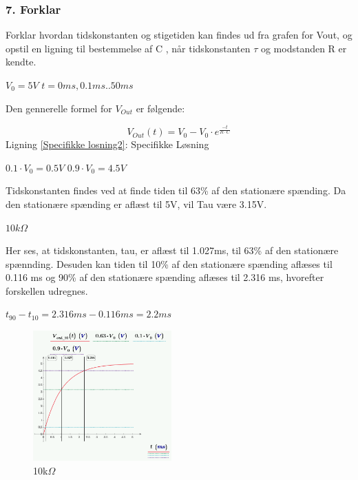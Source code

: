 \subsubsection*{7. Forklar}
Forklar hvordan tidskonstanten og stigetiden kan findes ud fra grafen for 	Vout, og opstil en ligning til bestemmelse af C , når tidskonstanten  $\tau$ og modstanden R er kendte.

$V_{0}=5V$
$t=0ms,0.1ms..50ms$

Den gennerelle formel for $V_{Out}$ er følgende:

\begin{center}
\begin{equation}
V_{Out}(t)=V_{0}-V_{0} \cdot e^{\frac{-t}{R \cdot C}}
\label{Specifikke losning2}
\end{equation}
Ligning \ref{Specifikke losning2}: Specifikke Løsning
\end{center}

\begin{center}
$0.1\cdot V_{0} = 0.5V$
$0.9 \cdot V_{0} = 4.5V$
\end{center}


Tidskonstanten findes ved at finde tiden til 63\% af den stationære spænding.
Da den stationære spænding er aflæst til 5V, vil Tau være 3.15V.

\textbf{$10k\Omega$}

Her ses, at tidskonstanten, tau, er aflæst til 1.027ms, til 63\% af den stationære spænnding.
Desuden kan tiden til 10\% af den stationære spænding aflæses til 0.116 ms og 90\% af den stationære spænding aflæses til 2.316 ms, hvorefter forskellen udregnes.
\begin{center}

$t_{90}-t_{10}=2.316ms-0.116ms=2.2ms$

\end{center}


\begin{figure}[h]
\begin{center}
\includegraphics[height=5cm]{M_Fig/Ana_1_tau_10ohm}
\caption{10k$\Omega$}
\label{tr1_10k}
\end{center}
\end{figure}


